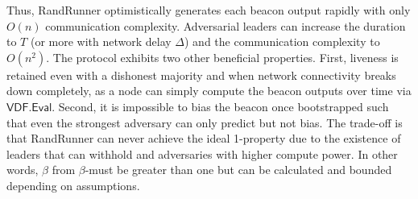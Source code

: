 
Thus, RandRunner optimistically generates each beacon output rapidly with only $O(n)$ communication complexity. Adversarial leaders can increase the \epoch duration to $T$ (or more with network delay $\Delta$) and the communication complexity to $O(n^2)$. The protocol exhibits two other beneficial properties. First, liveness is retained even with a dishonest majority and when network connectivity breaks down completely, as a node can simply compute the beacon outputs over time via $\mathsf{VDF.Eval}$. Second, it is impossible to bias the beacon once bootstrapped such that even the strongest adversary can only predict but not bias. The trade-off is that RandRunner can never achieve the ideal 1-\interunpredictability property due to the existence of leaders that can withhold and adversaries with higher compute power. In other words, $\beta$ from $\beta$-\interunpredictability must be greater than one but can be calculated and bounded~\cite{schindler2021randrunner} depending on assumptions.

